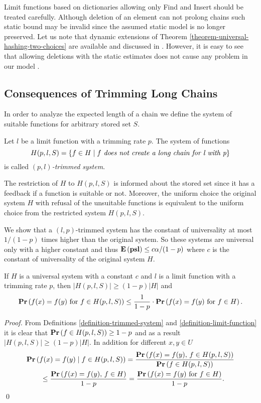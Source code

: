 Limit functions based on dictionaries allowing only Find and Insert should be treated carefully. Although deletion of an element can not prolong chains such static bound may be invalid since the assumed static model is no longer preserved. Let us note that dynamic extensions of Theorem \ref{theorem-universal-hashing-two-choices} are available and discussed in \cite{DBLP:journals/jacm/Vocking03}. However, it is easy to see that allowing deletions with the static estimates does not cause any problem in our model .

\subsection{Consequences of Trimming Long Chains}
In order to analyze the expected length of a chain we define the system of suitable functions for arbitrary stored set $S$.
\begin{definition}
\label{definition-trimmed-system}
Let $l$ be a limit function with a trimming rate $p$. The system of functions \[ H(p, l, S) = \{ f \in H \mid f \textit{ does not create a long chain for l with p} \} \] is called \emph{$(p, l)$-trimmed system}.
\end{definition}

The restriction of $H$ to $H(p, l, S)$ is informed about the stored set since it has a feedback if a function is suitable or not. Moreover, the uniform choice the original system $H$ with refusal of the unsuitable functions is equivalent to the uniform choice from the restricted system $H(p, l, S)$.

We show that a $(l, p)$-trimmed system has the constant of universality at most $1 / (1 - p)$ times higher than the original system. So these systems are universal only with a higher constant and thus $\mathbf{E}\left(\mathbf{psl}\right) \leq c\alpha/(1-p)$ where $c$ is the constant of universality of the original system $H$.

\begin{lemma}
\label{lemma-trimmed-system}
If $H$ is a universal system with a constant $c$ and $l$ is a limit function with a trimming rate $p$, then $|H(p, l, S)| \geq (1 - p)|H|$ and  \[ \mathbf{Pr}\left(f(x) = f(y) \mbox{ for } f \in H(p, l, S)\right) \leq \frac{1}{1 - p} \cdot \mathbf{Pr}\left(f(x) = f(y) \mbox{ for } f \in H\right). \]
\end{lemma}
\begin{proof}
From Definitions \ref{definition-trimmed-system} and \ref{definition-limit-function} it is clear that $\mathbf{Pr}\left(f \in H(p, l, S)\right) \geq 1 - p$ and as a result $|H(p, l, S)| \geq (1 - p)|H|$. In addition for different $x, y \in U$ 
\[
\begin{split}
& \mathbf{Pr}\left(f(x) = f(y) \mid f \in H(p, l, S)\right) 
	= \frac{\mathbf{Pr}\left(f(x) = f(y),\, f \in H(p, l, S)\right)}{\mathbf{Pr}\left(f \in H(p, l, S)\right)} \\
	& \qquad \leq \frac{\mathbf{Pr}\left(f(x) = f(y),\, f \in H\right)}{1 - p} = \frac{\mathbf{Pr}\left(f(x) = f(y) \mbox{ for } f \in H\right)}{1 - p}. \\
\end{split}
\]
\qed
\end{proof}

